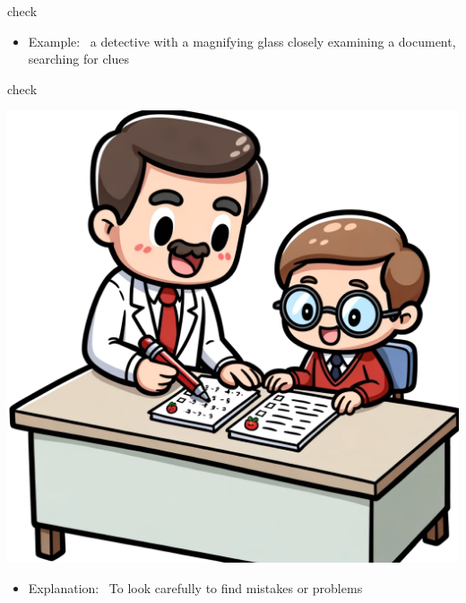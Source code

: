 \documentclass[avery5371, grid,frame]{flashcards}
\begin{document}
\begin{flashcard}{check}
\begin{center}
\begin{minipage}[c]{.45\textwidth}
\begin{itemize}
            \item Example: \ a detective with a magnifying glass closely examining a document, searching for clues
            \end{itemize}
        \end{minipage}
    \end{center}
    \vspace*{\fill}
\end{flashcard}\begin{flashcard}{check}
    \vspace*{\fill}
    \begin{center}
        \begin{minipage}[c]{.45\textwidth}
            \includegraphics[width=\textwidth]{cards/c/check/check - a teacher with a red pen, reviewing a student's homework on a desk, looking for errors.png}
        \end{minipage}
        \begin{minipage}[c]{.45\textwidth}
            \begin{itemize}\setlength\itemsep{12pt}
            \item Explanation: \ To look carefully to find mistakes or problems


\end{itemize}
\end{minipage}
\end{center}
\end{flashcard}
\end{document}
